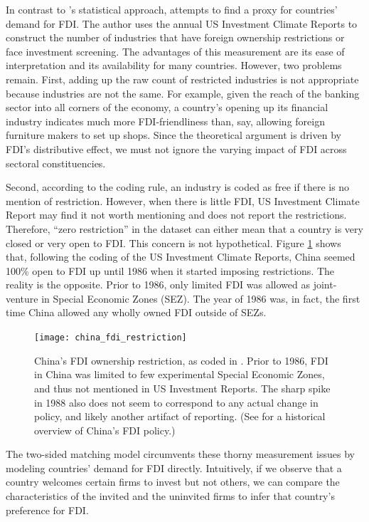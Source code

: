 In contrast to \citet{Pinto2013}'s statistical approach, \citet{Pandya2014,
  Pandya2016} attempts to find a proxy for countries' demand for FDI. The author
uses the annual US Investment Climate Reports to construct the number of
industries that have foreign ownership restrictions or face investment
screening. The advantages of this measurement are its ease of interpretation and
its availability for many countries. However, two problems remain. First, adding
up the raw count of restricted industries is not appropriate because industries
are not the same. For example, given the reach of the banking sector into all
corners of the economy, a country's opening up its financial industry indicates
much more FDI-friendliness than, say, allowing foreign furniture makers to set
up shops. Since the theoretical argument is driven by FDI's distributive effect,
we must not ignore the varying impact of FDI across sectoral constituencies.

Second, according to the coding rule, an industry is coded as free if there is
no mention of restriction. However, when there is little FDI, US Investment
Climate Report may find it not worth mentioning and does not report the
restrictions. Therefore, ``zero restriction'' in the dataset can either mean
that a country is very closed or very open to FDI. This concern is not
hypothetical. Figure \ref{fig:china_fdi_restriction} shows that, following the
coding of the US Investment Climate Reports, China seemed 100\% open to FDI up
until 1986 when it started imposing restrictions. The reality is the opposite.
Prior to 1986, only limited FDI was allowed as joint-venture in Special Economic
Zones (SEZ). The year of 1986 was, in fact, the first time China allowed any
wholly owned FDI outside of SEZs.

\begin{figure}[tbp] \centering
  \texttt{[image: china\_fdi\_restriction]}
  \caption[China's FDI ownership restriction.]{China's FDI ownership
    restriction, as coded in \citet{Pandya2010}. Prior to 1986, FDI in China was
    limited to few experimental Special Economic Zones, and thus not mentioned
    in US Investment Reports. The sharp spike in 1988 also does not seem to
    correspond to any actual change in policy, and likely another artifact of
    reporting. (See \citet{Zebregs2002} for a historical overview of China's FDI
    policy.)}
  \label{fig:china_fdi_restriction}
\end{figure}

The two-sided matching model circumvents these thorny measurement issues by
modeling countries' demand for FDI directly. Intuitively, if we observe that a
country welcomes certain firms to invest but not others, we can compare the
characteristics of the invited and the uninvited firms to infer that country's
preference for FDI.

